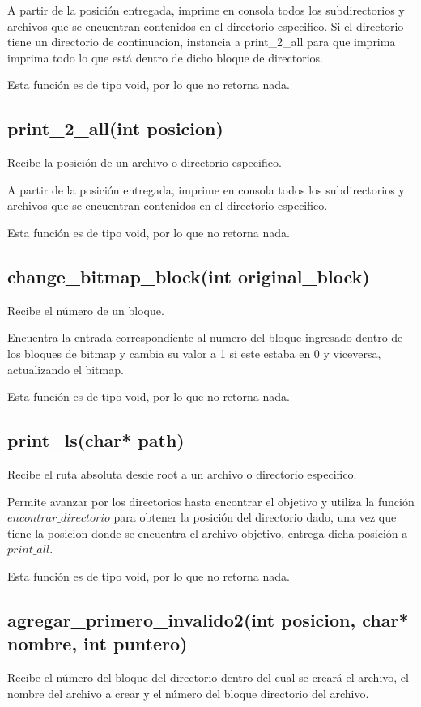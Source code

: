 \documentclass[12pt]{article}
\begin{document}
A partir de la posición entregada, imprime en consola todos los subdirectorios y archivos que se encuentran contenidos en el directorio especifico. Si el directorio tiene un directorio de continuacion, instancia a print\_2\_all para que imprima imprima todo lo que está dentro de dicho bloque de directorios.

Esta función es de tipo void, por lo que no retorna nada.

\subsection{print\_2\_all(int posicion)}
Recibe la posición de un archivo o directorio especifico.

A partir de la posición entregada, imprime en consola todos los subdirectorios y archivos que se encuentran contenidos en el directorio especifico.

Esta función es de tipo void, por lo que no retorna nada.

\subsection{change\_bitmap\_block(int original\_block)}
Recibe el número de un bloque.

Encuentra la entrada correspondiente al numero del bloque ingresado dentro de los bloques de bitmap y cambia su valor a 1 si este estaba en 0 y viceversa, actualizando el bitmap.

Esta función es de tipo void, por lo que no retorna nada.

\subsection{print\_ls(char* path)}
Recibe el ruta absoluta desde root a un archivo o directorio especifico.

Permite avanzar por los directorios hasta encontrar el objetivo y utiliza la función $encontrar\_directorio$ para obtener la posición del directorio dado, una vez que tiene la posicion donde se encuentra el archivo objetivo, entrega dicha posición a $print\_all$.

Esta función es de tipo void, por lo que no retorna nada.

\subsection{agregar\_primero\_invalido2(int posicion, char* nombre, int puntero)}
Recibe el número del bloque del directorio dentro del cual se creará el archivo, el nombre del archivo a crear y el número del bloque directorio del archivo.
\end{document}
